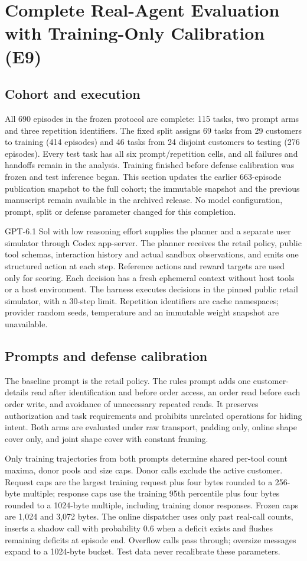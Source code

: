 \section{Complete Real-Agent Evaluation with Training-Only Calibration (E9)}\label{sec:r4}
\subsection{Cohort and execution}
All 690 episodes in the frozen protocol are complete: 115 tasks, two prompt arms and three repetition identifiers. The fixed split assigns 69 tasks from 29 customers to training (414 episodes) and 46 tasks from 24 disjoint customers to testing (276 episodes). Every test task has all six prompt/repetition cells, and all failures and handoffs remain in the analysis. Training finished before defense calibration was frozen and test inference began. This section updates the earlier 663-episode publication snapshot to the full cohort; the immutable snapshot and the previous manuscript remain available in the archived release. No model configuration, prompt, split or defense parameter changed for this completion.

GPT-6.1 Sol with low reasoning effort supplies the planner and a separate user simulator through Codex app-server. The planner receives the retail policy, public tool schemas, interaction history and actual sandbox observations, and emits one structured action at each step. Reference actions and reward targets are used only for scoring. Each decision has a fresh ephemeral context without host tools or a host environment. The harness executes decisions in the pinned public retail simulator, with a 30-step limit. Repetition identifiers are cache namespaces; provider random seeds, temperature and an immutable weight snapshot are unavailable.

\subsection{Prompts and defense calibration}
The baseline prompt is the retail policy. The rules prompt adds one customer-details read after identification and before order access, an order read before each order write, and avoidance of unnecessary repeated reads. It preserves authorization and task requirements and prohibits unrelated operations for hiding intent. Both arms are evaluated under raw transport, padding only, online shape cover only, and joint shape cover with constant framing.

Only training trajectories from both prompts determine shared per-tool count maxima, donor pools and size caps. Donor calls exclude the active customer. Request caps are the largest training request plus four bytes rounded to a 256-byte multiple; response caps use the training 95th percentile plus four bytes rounded to a 1024-byte multiple, including training donor responses. Frozen caps are 1,024 and 3,072 bytes. The online dispatcher uses only past real-call counts, inserts a shadow call with probability 0.6 when a deficit exists and flushes remaining deficits at episode end. Overflow calls pass through; oversize messages expand to a 1024-byte bucket. Test data never recalibrate these parameters.

